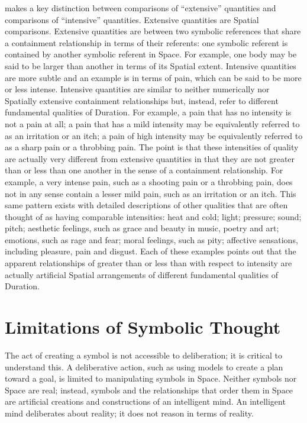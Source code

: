 \cite{bergson:1910} makes a key distinction between comparisons of
``extensive'' quantities and comparisons of ``intensive'' quantities.
Extensive quantities are Spatial comparisons.  Extensive quantities
are between two symbolic references that share a containment
relationship in terms of their referents: one symbolic referent is
contained by another symbolic referent in Space.  For example, one
body may be said to be larger than another in terms of its Spatial
extent.  Intensive quantities are more subtle and an example is in
terms of pain, which can be said to be more or less intense.
Intensive quantities are similar to neither numerically nor Spatially
extensive containment relationships but, instead, refer to different
fundamental qualities of Duration.  For example, a pain that has no
intensity is not a pain at all; a pain that has a mild intensity may
be equivalently referred to as an irritation or an itch; a pain of
high intensity may be equivalently referred to as a sharp pain or a
throbbing pain.  The point is that these intensities of quality are
actually very different from extensive quantities in that they are not
greater than or less than one another in the sense of a containment
relationship.  For example, a very intense pain, such as a shooting
pain or a throbbing pain, does not in any sense contain a lesser mild
pain, such as an irritation or an itch.  This same pattern exists with
detailed descriptions of other qualities that are often thought of as
having comparable intensities: heat and cold; light; pressure; sound;
pitch; aesthetic feelings, such as grace and beauty in music, poetry
and art; emotions, such as rage and fear; moral feelings, such as
pity; affective sensations, including pleasure, pain and disgust.
Each of these examples points out that the apparent relationships of
greater than or less than with respect to intensity are actually
artificial Spatial arrangements of different fundamental qualities of
Duration.

\section{Limitations of Symbolic Thought}

The act of creating a symbol is not accessible to deliberation; it is
critical to understand this.  A deliberative action, such as using
models to create a plan toward a goal, is limited to manipulating
symbols in Space.  Neither symbols nor Space are real; instead,
symbols and the relationships that order them in Space are artificial
creations and constructions of an intelligent mind.  An intelligent
mind deliberates about reality; it does not reason in terms of
reality.

